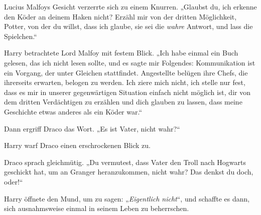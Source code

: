 Lucius Malfoys Gesicht verzerrte sich zu einem Knurren.
„Glaubst du, ich erkenne den Köder an deinem Haken nicht? Erzähl mir von der dritten Möglichkeit, Potter, von der du willst, dass ich glaube, sie sei die \emph{wahre} Antwort, und lass die Spielchen.“

Harry betrachtete Lord Malfoy mit festem Blick.
„Ich habe einmal ein Buch gelesen, das ich nicht lesen sollte, und es sagte mir Folgendes: Kommunikation ist ein Vorgang, der unter Gleichen stattfindet. Angestellte belügen ihre Chefs, die ihrerseits erwarten, belogen zu werden. Ich ziere mich nicht, ich stelle nur fest, dass es mir in unserer gegenwärtigen Situation einfach nicht möglich ist, dir von dem dritten Verdächtigen zu erzählen und dich glauben zu lassen, dass meine Geschichte etwas anderes als ein Köder war.“

Dann ergriff Draco das Wort.
„Es ist Vater, nicht wahr?“

Harry warf Draco einen erschrockenen Blick zu.

Draco sprach gleichmütig.
„Du vermutest, dass Vater den Troll nach Hogwarts geschickt hat, um an Granger heranzukommen, nicht wahr? Das denkst du doch, oder!“

Harry öffnete den Mund, um zu sagen: „\emph{Eigentlich nicht}“, und schaffte es dann, sich ausnahmsweise einmal in seinem Leben zu beherrschen.

